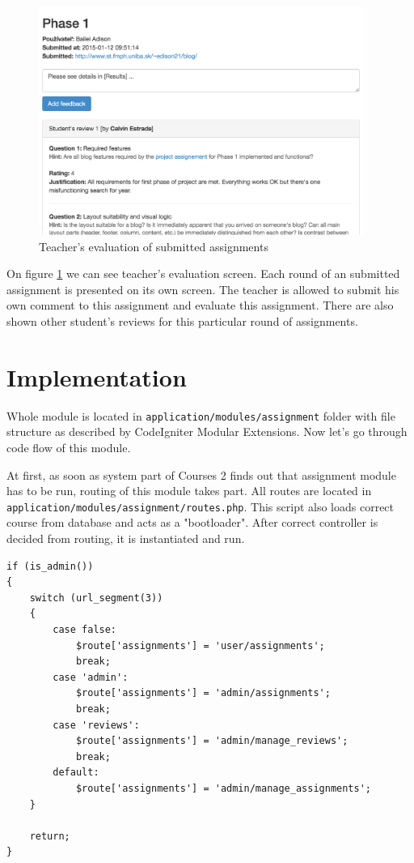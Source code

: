 \begin{figure}[h]
    \centering
    \includegraphics[width=0.95\textwidth]{images/teachereval.png}
    \caption{Teacher's evaluation of submitted assignments}
    \label{teachereval}
\end{figure}


On figure \ref{teachereval} we can see teacher's evaluation screen. Each round of an submitted assignment is presented on its own screen. The teacher is allowed to submit his own comment to this assignment and evaluate this assignment. There are also shown other student's reviews for this particular round of assignments. 

\section{Implementation}

Whole module is located in \texttt{application/modules/assignment} folder with file structure as described by CodeIgniter Modular Extensions. Now let's go through code flow of this module.


At first, as soon as system part of Courses 2 finds out that assignment module has to be run, routing of this module takes part. All routes are located in \texttt{application/modules/assignment/routes.php}. This script also loads correct course from database and acts as a "bootloader". After correct controller is decided from routing, it is instantiated and run.

\begin{lstlisting}[label={assrouting}, caption={Routing in assignments module for administrator}]
if (is_admin())
{
    switch (url_segment(3))
    {
        case false:
            $route['assignments'] = 'user/assignments';
            break;
        case 'admin':
            $route['assignments'] = 'admin/assignments';
            break;
        case 'reviews':
            $route['assignments'] = 'admin/manage_reviews';
            break;
        default:
            $route['assignments'] = 'admin/manage_assignments';
    }

    return;
}
\end{lstlisting}



